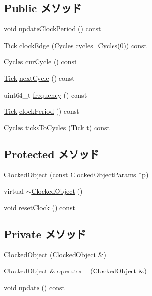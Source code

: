 \subsection*{Public メソッド}
\begin{DoxyCompactItemize}
\item 
void \hyperlink{classClockedObject_a2b1ce4e5fff654f673292b09c44780c0}{updateClockPeriod} () const 
\item 
\hyperlink{base_2types_8hh_a5c8ed81b7d238c9083e1037ba6d61643}{Tick} \hyperlink{classClockedObject_a773956693f216cafb7d4cad92ad582e5}{clockEdge} (\hyperlink{classCycles}{Cycles} cycles=\hyperlink{classCycles}{Cycles}(0)) const 
\item 
\hyperlink{classCycles}{Cycles} \hyperlink{classClockedObject_a3f6dfa1d3e7cd47666433b6caa4d34d6}{curCycle} () const 
\item 
\hyperlink{base_2types_8hh_a5c8ed81b7d238c9083e1037ba6d61643}{Tick} \hyperlink{classClockedObject_abbbab15df430cd1edc7f3ef750198a0c}{nextCycle} () const 
\item 
uint64\_\-t \hyperlink{classClockedObject_a47ad0ff313f0dcb63b8223b1f11d49d8}{frequency} () const 
\item 
\hyperlink{base_2types_8hh_a5c8ed81b7d238c9083e1037ba6d61643}{Tick} \hyperlink{classClockedObject_a78c89cef17196c60470c4f2f76d43d8a}{clockPeriod} () const 
\item 
\hyperlink{classCycles}{Cycles} \hyperlink{classClockedObject_a91cfeb85669839d1ecafb7e62cf9d57a}{ticksToCycles} (\hyperlink{base_2types_8hh_a5c8ed81b7d238c9083e1037ba6d61643}{Tick} t) const 
\end{DoxyCompactItemize}
\subsection*{Protected メソッド}
\begin{DoxyCompactItemize}
\item 
\hyperlink{classClockedObject_a3106e3ad89e9d5ed67751bd9a2ee8c68}{ClockedObject} (const ClockedObjectParams $\ast$p)
\item 
virtual \hyperlink{classClockedObject_a2f1ff92cfe792a99c7d65f11bccb3d79}{$\sim$ClockedObject} ()
\item 
void \hyperlink{classClockedObject_a7c7c8afaf47b89e48578fabd1ce491da}{resetClock} () const 
\end{DoxyCompactItemize}
\subsection*{Private メソッド}
\begin{DoxyCompactItemize}
\item 
\hyperlink{classClockedObject_a92f78d5c8554a264a3b22b90b452de45}{ClockedObject} (\hyperlink{classClockedObject_1_1ClockedObject}{ClockedObject} \&)
\item 
\hyperlink{classClockedObject_1_1ClockedObject}{ClockedObject} \& \hyperlink{classClockedObject_a2ade080e5da78e3b6e5821d3ad92623a}{operator=} (\hyperlink{classClockedObject_1_1ClockedObject}{ClockedObject} \&)
\item 
void \hyperlink{classClockedObject_ac277f12bf13b157b9686a275f723612f}{update} () const 
\end{DoxyCompactItemize}

